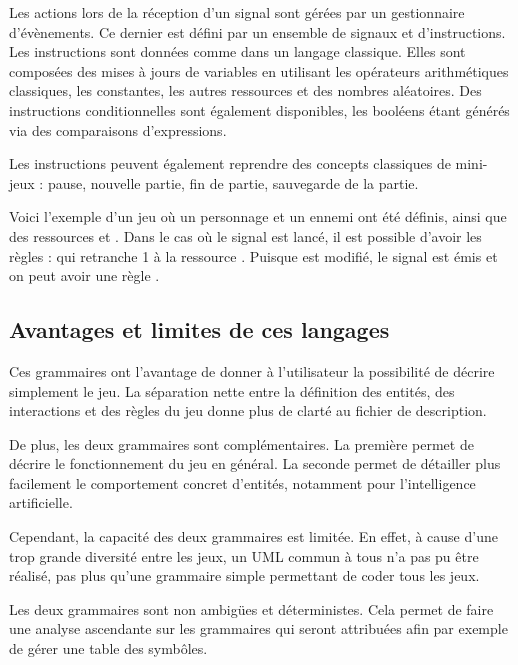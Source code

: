 Les actions lors de la réception d'un signal sont gérées par un gestionnaire d'évènements.
Ce dernier est défini par un ensemble de signaux et d'instructions.
Les instructions sont données comme dans un langage classique.
Elles sont composées des mises à jours de variables en utilisant les opérateurs arithmétiques classiques, les constantes, les autres ressources et des nombres
aléatoires.
Des instructions conditionnelles sont également disponibles, les booléens étant générés via des comparaisons d'expressions.

Les instructions peuvent également reprendre des concepts classiques de mini-jeux : pause, nouvelle partie, fin de partie, sauvegarde de la partie.

Voici l'exemple  d'un jeu où un personnage  et un ennemi  ont été définis, ainsi que des ressources  et .
Dans le cas où le signal  est lancé, il est possible d'avoir les règles :
 qui retranche 1 à la ressource .
Puisque  est modifié, le signal  est émis et on peut avoir une règle
.

\subsection{Avantages et limites de ces langages}

Ces grammaires ont l'avantage de donner à l'utilisateur la possibilité de décrire simplement le jeu.
La séparation nette entre la définition des entités, des interactions et des règles du jeu donne plus de clarté au fichier de description.

De plus, les deux grammaires sont complémentaires. La première permet de décrire le fonctionnement du jeu en général. La seconde permet
de détailler plus facilement le comportement concret d'entités, notamment pour l'intelligence artificielle.

Cependant, la capacité des deux grammaires est limitée.
En effet, à cause d'une trop grande diversité entre les jeux, un UML commun à tous n'a pas pu être réalisé,
 pas plus qu'une grammaire simple permettant de coder tous les jeux.

Les deux grammaires sont non ambigües et déterministes.
Cela permet de faire une analyse ascendante sur les grammaires qui seront attribuées afin par exemple de gérer une table des symbôles.
